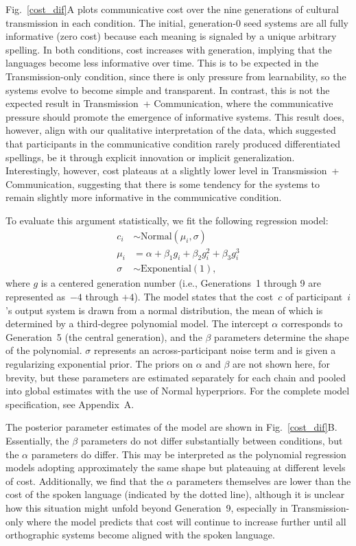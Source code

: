 \documentclass[doc,biblatex]{apa7}
\begin{document}
Fig.~\ref{cost_dif}A plots communicative cost over the nine generations of cultural transmission in each condition. The initial, generation-0 seed systems are all fully informative (zero cost) because each meaning is signaled by a unique arbitrary spelling. In both conditions, cost increases with generation, implying that the languages become less informative over time. This is to be expected in the Transmission-only condition, since there is only pressure from learnability, so the systems evolve to become simple and transparent. In contrast, this is not the expected result in Transmission~+ Communication, where the communicative pressure should promote the emergence of informative systems. This result does, however, align with our qualitative interpretation of the data, which suggested that participants in the communicative condition rarely produced differentiated spellings, be it through explicit innovation or implicit generalization. Interestingly, however, cost plateaus at a slightly lower level in Transmission~+ Communication, suggesting that there is some tendency for the systems to remain slightly more informative in the communicative condition.

To evaluate this argument statistically, we fit the following regression model:
	\begin{equation}
	\begin{aligned}
	   c_i & \sim \mathrm{Normal}(\mu_i, \sigma) \\
	 \mu_i & =    \alpha + \beta_1 g_i + \beta_2 g_i^2 + \beta_3 g_i^3 \\
	\sigma & \sim \mathrm{Exponential}(1),
	\end{aligned}
	\end{equation}
where $g$ is a centered generation number (i.e., Generations~1 through 9 are represented as~$-4$ through $+4$). The model states that the cost~$c$ of participant~$i$'s output system is drawn from a normal distribution, the mean of which is determined by a third-degree polynomial model. The intercept $\alpha$ corresponds to Generation~5 (the central generation), and the $\beta$ parameters determine the shape of the polynomial. $\sigma$ represents an across-participant noise term and is given a regularizing exponential prior. The priors on $\alpha$ and $\beta$ are not shown here, for brevity, but these parameters are estimated separately for each chain and pooled into global estimates with the use of Normal hyperpriors. For the complete model specification, see Appendix~A.

The posterior parameter estimates of the model are shown in Fig.~\ref{cost_dif}B. Essentially, the $\beta$ parameters do not differ substantially between conditions, but the $\alpha$ parameters do differ. This may be interpreted as the polynomial regression models adopting approximately the same shape but plateauing at different levels of cost. Additionally, we find that the $\alpha$ parameters themselves are lower than the cost of the spoken language (indicated by the dotted line), although it is unclear how this situation might unfold beyond Generation~9, especially in Transmission-only where the model predicts that cost will continue to increase further until all orthographic systems become aligned with the spoken language.
\end{document}
